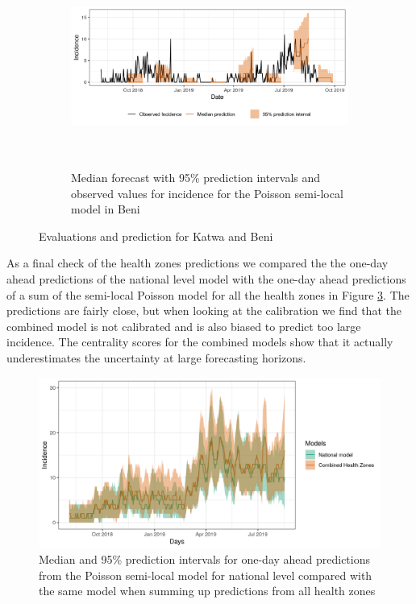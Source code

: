 \documentclass[12pt]{article}
\begin{document}
\begin{figure}[h!]
\begin{subfigure}{\textwidth} 
  \centering
  \includegraphics[width=0.9\linewidth, height=6.6cm]{../output/Beni_predictions.png}
  \caption{ Median forecast with 95\% prediction intervals and observed values for incidence for the Poisson semi-local model in Beni}
  \label{fig:beni_katwa_4}
\end{subfigure}
\caption{Evaluations and prediction for Katwa and Beni}


\label{fig:beni_katwa}
\end{figure}
As a final check of the health zones predictions we compared the the one-day ahead predictions of the national level model with the one-day ahead predictions of a sum of the semi-local Poisson model for all the health zones in Figure \ref{fig:nat_nat_comb}. The predictions are fairly close, but when looking at the  calibration we find that the combined model is not calibrated and is also biased to predict too large incidence. The centrality scores for the combined models show that it actually underestimates the uncertainty at large forecasting horizons. 

\begin{figure}[h!]
  \centering
  \includegraphics[width=0.9\linewidth]{../output/nat_combined.png}
  \caption{Median and 95\% prediction intervals for one-day ahead predictions from the Poisson semi-local model for national level compared with the same model when summing up predictions from all health zones}
  \label{fig:nat_nat_comb}
  
\end{figure}
\end{document}
